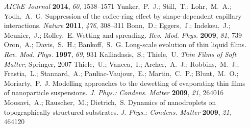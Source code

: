 \documentclass[journal=langd5,manuscript=article]{achemso}
\begin{document}
\begin{mcitethebibliography}{71}
  \emph{AIChE Journal} \textbf{2014}, \emph{60}, 1538--1571\relax
\mciteBstWouldAddEndPuncttrue
\mciteSetBstMidEndSepPunct{\mcitedefaultmidpunct}
{\mcitedefaultendpunct}{\mcitedefaultseppunct}\relax
\EndOfBibitem
{}
Yunker,~P.~J.; Still,~T.; Lohr,~M.~A.; Yodh,~A.~G. Suppression of the
  coffee-ring effect by shape-dependent capillary interactions. \emph{Nature}
  \textbf{2011}, \emph{476}, 308--311\relax
\mciteBstWouldAddEndPuncttrue
\mciteSetBstMidEndSepPunct{\mcitedefaultmidpunct}
{\mcitedefaultendpunct}{\mcitedefaultseppunct}\relax
\EndOfBibitem
{}
Bonn,~D.; Eggers,~J.; Indekeu,~J.; Meunier,~J.; Rolley,~E. Wetting and
  spreading. \emph{Rev. Mod. Phys.} \textbf{2009}, \emph{81}, 739\relax
\mciteBstWouldAddEndPuncttrue
\mciteSetBstMidEndSepPunct{\mcitedefaultmidpunct}
{\mcitedefaultendpunct}{\mcitedefaultseppunct}\relax
\EndOfBibitem
{}
Oron,~A.; Davis,~S.~H.; Bankoff,~S.~G. Long-scale evolution of thin liquid
  films. \emph{Rev. Mod. Phys.} \textbf{1997}, \emph{69}, 931\relax
\mciteBstWouldAddEndPuncttrue
\mciteSetBstMidEndSepPunct{\mcitedefaultmidpunct}
{\mcitedefaultendpunct}{\mcitedefaultseppunct}\relax
\EndOfBibitem
{}
Kalliadasis,~S.; Thiele,~U. \emph{Thin Films of Soft Matter}; Springer,
  2007\relax
\mciteBstWouldAddEndPuncttrue
\mciteSetBstMidEndSepPunct{\mcitedefaultmidpunct}
{\mcitedefaultendpunct}{\mcitedefaultseppunct}\relax
\EndOfBibitem
{}
Thiele,~U.; Vancea,~I.; Archer,~A.~J.; Robbins,~M.~J.; Frastia,~L.;
  Stannard,~A.; Pauliac-Vaujour,~E.; Martin,~C.~P.; Blunt,~M.~O.;
  Moriarty,~P.~J. Modelling approaches to the dewetting of evaporating thin
  films of nanoparticle suspensions. \emph{J. Phys.: Condens. Matter}
  \textbf{2009}, \emph{21}, 264016\relax
\mciteBstWouldAddEndPuncttrue
\mciteSetBstMidEndSepPunct{\mcitedefaultmidpunct}
{\mcitedefaultendpunct}{\mcitedefaultseppunct}\relax
\EndOfBibitem
{}
Moosavi,~A.; Rauscher,~M.; Dietrich,~S. Dynamics of nanodroplets on
  topographically structured substrates. \emph{J. Phys.: Condens. Matter}
  \textbf{2009}, \emph{21}, 464120\relax
\mciteBstWouldAddEndPuncttrue

\end{mcitethebibliography}
\end{document}
